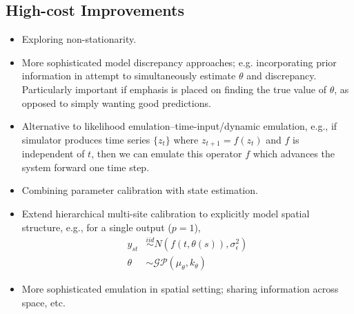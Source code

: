 \documentclass[12pt]{article}
\begin{document}
\subsection{High-cost Improvements}
\begin{itemize}
\item Exploring non-stationarity. 
\item More sophisticated model discrepancy approaches; e.g. incorporating prior information in attempt to simultaneously estimate $\theta$ and discrepancy. Particularly important if emphasis is placed on finding 
the true value of $\theta$, as opposed to simply wanting good predictions. 
\item Alternative to likelihood emulation--time-input/dynamic emulation, e.g., if simulator produces time series $\{z_t\}$ where $z_{t + 1} = f(z_t)$ and $f$ is independent of $t$, then we can emulate this operator $f$ 
which advances the system forward one time step.
\item Combining parameter calibration with state estimation.  
\item Extend hierarchical multi-site calibration to explicitly model spatial structure, e.g., for a single output ($p=1$), 
	\begin{align}
	y_{st} &\overset{iid}{\sim} N(f(t, \theta(s)), \sigma^2_\epsilon) \\
	\theta &\sim \mathcal{GP}(\mu_\theta, k_\theta)
	\end{align}
\item More sophisticated emulation in spatial setting; sharing information across space, etc. 
\end{itemize}
\end{document}
